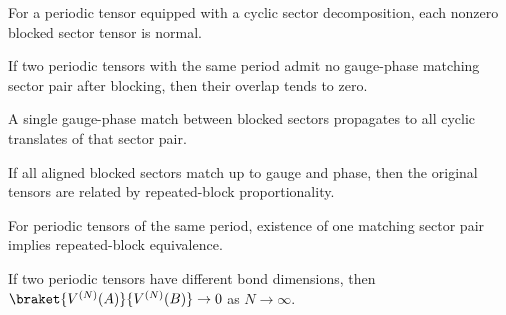 \begin{lemma}\label{lem:sector_blocked_normal_periodic}
    \leanok
    For a periodic tensor equipped with a cyclic sector decomposition,
    each nonzero blocked sector tensor is normal.
\end{lemma}

\begin{theorem}%
    \label{thm:periodic_overlap_zero_no_sector_match}
    \notready
    If two periodic tensors with the same period admit no gauge-phase
    matching sector pair after blocking, then their overlap tends to zero.
\end{theorem}

\begin{lemma}\label{lem:sector_match_propagation}
    \notready
    A single gauge-phase match between blocked sectors propagates to all
    cyclic translates of that sector pair.
\end{lemma}

\begin{lemma}%
    \label{lem:sector_tensor_proportional_blocked_match}
    \notready
    If all aligned blocked sectors match up to gauge and phase, then the
    original tensors are related by repeated-block proportionality.
\end{lemma}

\begin{theorem}%
    \label{thm:periodic_overlap_gauge_equiv_sector_match}
    \notready
    For periodic tensors of the same period, existence of one matching
    sector pair implies repeated-block equivalence.
\end{theorem}

\begin{theorem}%
    \label{thm:periodic_overlap_zero_ne_dim}
    \leanok
    If two periodic tensors have different bond dimensions, then
    $\braket{V^{(N)}(A)}{V^{(N)}(B)} \to 0$ as $N\to\infty$.
\end{theorem}

